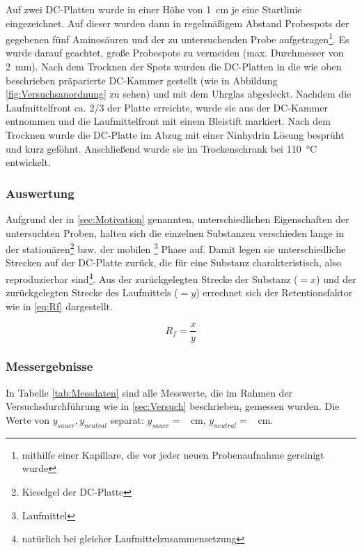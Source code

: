 \documentclass{article}
\begin{document}
        Auf zwei DC-Platten wurde in einer Höhe von \SI[mode=text]{1}{\centi\meter} je eine Startlinie eingezeichnet. Auf dieser wurden dann in regelmäßigem Abstand Probespots der gegebenen fünf Aminosäuren und der zu untersuchenden Probe aufgetragen\footnote{mithilfe einer Kapillare, die vor jeder neuen Probenaufnahme gereinigt wurde}. Es wurde darauf geachtet, große Probespots zu vermeiden (max. Durchmesser von \SI[mode=text]{2}{\milli\meter}). Nach dem Trocknen der Spots wurden die DC-Platten in die wie oben beschrieben präparierte DC-Kammer gestellt (wie in Abbildung \ref{fig:Versuchsanordnung} zu sehen) und mit dem Uhrglas abgedeckt. Nachdem die Laufmittelfront ca. 2/3 der Platte erreichte, wurde sie aus der DC-Kammer entnommen und die Laufmittelfront mit einem Bleistift markiert. Nach dem Trocknen wurde die DC-Platte im Abzug mit einer Ninhydrin Lösung besprüht und kurz geföhnt. Anschließend wurde sie im Trockenschrank bei \SI[mode=text]{110}{\degreeCelsius} entwickelt.
    
      \subsubsection{Auswertung}
    
        Aufgrund der in \ref{sec:Motivation} genannten, unterschiedlichen Eigenschaften der untersuchten Proben, halten sich die einzelnen Substanzen verschieden lange in der stationären\footnote{Kieselgel der DC-Platte} bzw. der mobilen \footnote{Laufmittel} Phase auf. Damit legen sie unterschiedliche Strecken auf der DC-Platte zurück, die für eine  Substanz charakteristisch, also reproduzierbar sind\footnote{natürlich bei gleicher Laufmittelzusammensetzung}. Aus der zurückgelegten Strecke der Substanz ($= x$) und der zurückgelegten Strecke des Laufmittels ($= y$) errechnet sich der Retentionsfaktor wie in \eqref{eq:Rf} dargestellt.
    
        \begin{equation}
          R_{f} = \frac{x}{y} \label{eq:Rf}
        \end{equation}
      
      \subsubsection{Messergebnisse}
    
        In Tabelle \ref{tab:Messdaten} sind alle Messwerte, die im Rahmen der Versuchsdurchführung wie in \ref{sec:Versuch} beschrieben, gemessen wurden. Die Werte von $y_{sauer}, y_{neutral}$ separat: $y_{sauer} = $ \SI[mode=text]{}{\centi\meter}, $y_{neutral} = $ \SI[mode=text]{}{\centi\meter}.
      
\end{document}

